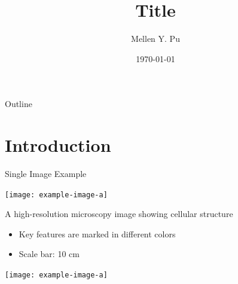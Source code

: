 \documentclass[handout,t,aspectratio=1610]{beamer}
\title{Title}
\author{Mellen Y. Pu}
\date{\today}
\begin{document}
\frame{\titlepage}

\section[Outline]{}
\begin{frame}{Outline}
    \tableofcontents
\end{frame}


\section{Introduction}

    \begin{frame}{Single Image Example}
        \begin{center}
            \texttt{[image: example-image-a]}

            \vspace{0.5em}
            {\small A high-resolution microscopy image showing cellular structure}
        \end{center}

        \vspace{0.5em}
        \begin{itemize}
            \item Key features are marked in different colors
            \item Scale bar: 10 cm
        \end{itemize}
    \end{frame}

    \begin{frame}{}
        \vspace*{0.15cm}  %
        \begin{center}
            \texttt{[image: example-image-a]}
        \end{center}
    \end{frame}
\end{document}
